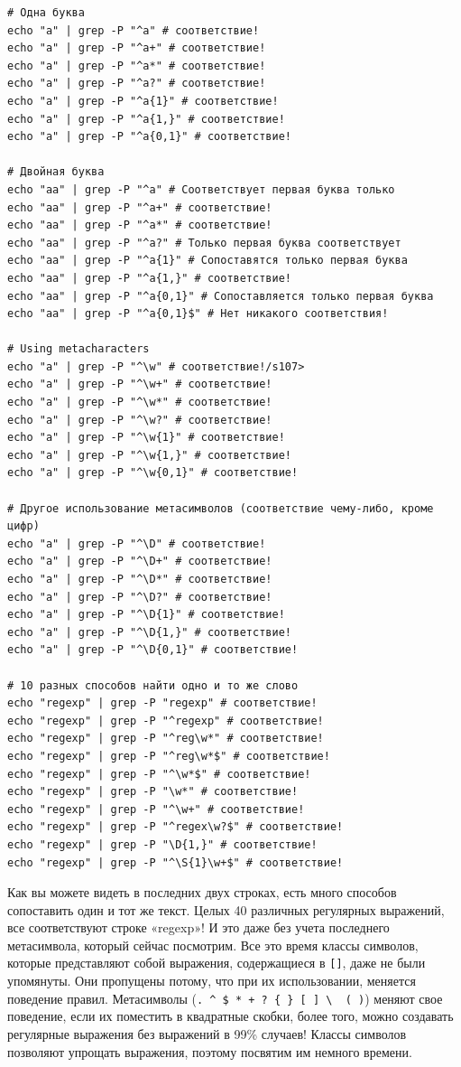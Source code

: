 \documentclass[12pt]{article}
\begin{document}
\begin{verbatim}
# Одна буква
echo "a" | grep -P "^a" # соответствие!
echo "a" | grep -P "^a+" # соответствие!
echo "a" | grep -P "^a*" # соответствие!
echo "a" | grep -P "^a?" # соответствие!
echo "a" | grep -P "^a{1}" # соответствие!
echo "a" | grep -P "^a{1,}" # соответствие!
echo "a" | grep -P "^a{0,1}" # соответствие!

# Двойная буква
echo "aa" | grep -P "^a" # Соответствует первая буква только
echo "aa" | grep -P "^a+" # соответствие!
echo "aa" | grep -P "^a*" # соответствие!
echo "aa" | grep -P "^a?" # Только первая буква соответствует
echo "aa" | grep -P "^a{1}" # Сопоставятся только первая буква
echo "aa" | grep -P "^a{1,}" # соответствие!
echo "aa" | grep -P "^a{0,1}" # Сопоставляется только первая буква
echo "aa" | grep -P "^a{0,1}$" # Нет никакого соответствия!

# Using metacharacters
echo "a" | grep -P "^\w" # соответствие!/s107>
echo "a" | grep -P "^\w+" # соответствие!
echo "a" | grep -P "^\w*" # соответствие!
echo "a" | grep -P "^\w?" # соответствие!
echo "a" | grep -P "^\w{1}" # соответствие!
echo "a" | grep -P "^\w{1,}" # соответствие!
echo "a" | grep -P "^\w{0,1}" # соответствие!

# Другое использование метасимволов (соответствие чему-либо, кроме цифр)
echo "a" | grep -P "^\D" # соответствие!
echo "a" | grep -P "^\D+" # соответствие!
echo "a" | grep -P "^\D*" # соответствие!
echo "a" | grep -P "^\D?" # соответствие!
echo "a" | grep -P "^\D{1}" # соответствие!
echo "a" | grep -P "^\D{1,}" # соответствие!
echo "a" | grep -P "^\D{0,1}" # соответствие!

# 10 разных способов найти одно и то же слово
echo "regexp" | grep -P "regexp" # соответствие!
echo "regexp" | grep -P "^regexp" # соответствие!
echo "regexp" | grep -P "^reg\w*" # соответствие!
echo "regexp" | grep -P "^reg\w*$" # соответствие!
echo "regexp" | grep -P "^\w*$" # соответствие!
echo "regexp" | grep -P "\w*" # соответствие!
echo "regexp" | grep -P "^\w+" # соответствие!
echo "regexp" | grep -P "^regex\w?$" # соответствие!
echo "regexp" | grep -P "\D{1,}" # соответствие!
echo "regexp" | grep -P "^\S{1}\w+$" # соответствие!
\end{verbatim}

Как вы можете видеть в последних двух строках, есть много способов
сопоставить один и тот же текст. Целых 40 различных регулярных
выражений, все соответствуют строке «regexp»! И это даже без учета
последнего метасимвола, который сейчас посмотрим. Все это время классы
символов, которые представляют собой выражения, содержащиеся в
\texttt{{[}{]}}, даже не были упомянуты. Они пропущены потому, что при
их использовании, меняется поведение правил. Метасимволы
(\texttt{.\ \^{}\ \$\ *\ +\ ?\ \{\ \}\ {[}\ {]}\ \textbackslash{}\ \textbar{}\ (\ )})
меняют свое поведение, если их поместить в квадратные скобки, более
того, можно создавать регулярные выражения без выражений в 99\% случаев!
Классы символов позволяют упрощать выражения, поэтому посвятим им
немного времени.
\end{document}
